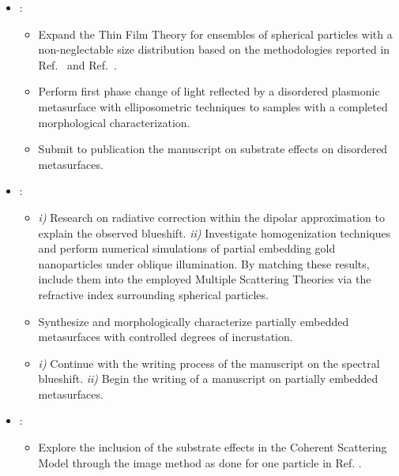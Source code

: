 \begin{itemize}
	\renewcommand\labelitemi{\textcolor{pblueFC}{$\blacktriangleright$}}
	\renewcommand\labelitemii{\textcolor{sredFC}{$\blacktriangleright$}}
	\setlength\itemsep{.5em}
	\item {}: 
		 \begin{itemize}
		 	\item {} Expand the Thin Film Theory for ensembles of spherical particles with a non-neglectable size distribution based on the methodologies reported in Ref.~\cite{vazquez-estrada_optical_2014} and Ref.~\cite{toudert_advanced_2012}.
		 	\item{} Perform first phase change of light  reflected by a disordered plasmonic metasurface with elliposometric techniques to samples with a completed morphological characterization.
		 	\item{} Submit to publication the manuscript  on substrate effects on disordered metasurfaces. 
		 \end{itemize}
	\item {}:
		\begin{itemize}
			\item {} \textit{i)} Research on radiative correction within the dipolar approximation \cite{moroz_depolarization_2009,januar_role_2020} to explain the observed blueshift. \textit{ii)} Investigate homogenization techniques  and perform numerical simulations of partial embedding gold nanoparticles under oblique illumination. By matching these results, include them into the employed Multiple Scattering Theories via the refractive index surrounding spherical particles.
			\item{} Synthesize and morphologically characterize partially embedded metasurfaces with controlled degrees of incrustation.
			\item{} \textit{i)} Continue  with the writing process of the manuscript on the spectral blueshift. \textit{ii)} Begin the writing of a manuscript on partially embedded metasurfaces.
		\end{itemize}	 
	\item {}:
		\begin{itemize}
			\item {} Explore the inclusion of the substrate effects in the Coherent Scattering Model through the image method as done for one particle in Ref. \cite{bosi_optical_1996}.

\end{itemize}
\end{itemize}
